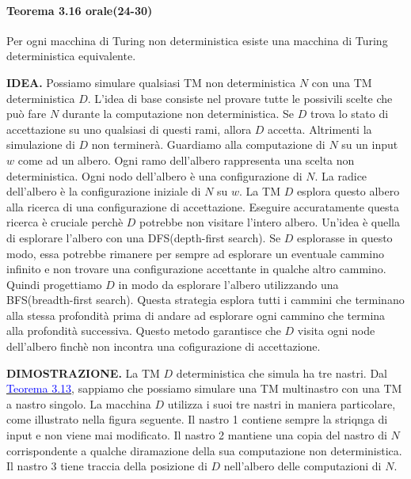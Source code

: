 \documentclass{article}
\begin{document}
\paragraph{Teorema 3.16 orale(24-30)}
\label{teorema-3.16}
\text{ }

\begin{tcolorbox}[colback=blue!10!white, colframe=blue!50!black, title=Teorema 3.16 orale(24-30)]
    Per ogni macchina di Turing non deterministica esiste una macchina di Turing deterministica equivalente.
\end{tcolorbox}

\textbf{IDEA.}
Possiamo simulare qualsiasi TM non deterministica $N$ con una TM deterministica $D$.
L'idea di base consiste nel provare tutte le possivili scelte che può fare $N$ durante la computazione non deterministica.
Se $D$ trova lo stato di accettazione su uno qualsiasi di questi rami, allora $D$ accetta.
Altrimenti la simulazione di $D$ non terminerà.
Guardiamo alla computazione di $N$ su un input $w$ come ad un albero.
Ogni ramo dell'albero rappresenta una scelta non deterministica.
Ogni nodo dell'albero è una configurazione di $N$.
La radice dell'albero è la configurazione iniziale di $N$ su $w$.
La TM $D$ esplora questo albero alla ricerca di una configurazione di accettazione.
Eseguire accuratamente questa ricerca è cruciale perchè $D$ potrebbe non visitare l'intero albero.
Un'idea è quella di esplorare l'albero con una DFS(depth-first search).
Se $D$ esplorasse in questo modo, essa potrebbe rimanere per sempre ad esplorare un eventuale cammino infinito e non trovare una configurazione accettante in qualche altro cammino.
Quindi progettiamo $D$ in modo da esplorare l'albero utilizzando una BFS(breadth-first search).
Questa strategia esplora tutti i cammini che terminano alla stessa profondità prima di andare ad esplorare ogni cammino che termina alla profondità successiva.
Questo metodo garantisce che $D$ visita ogni node dell'albero finchè non incontra una cofigurazione di accettazione.
\vspace{1em}

\textbf{DIMOSTRAZIONE.}
La TM $D$ deterministica che simula ha tre nastri.
Dal \hyperref[th:da MdT multitape a single tape]{\textcolor{blue}{Teorema 3.13}}, sappiamo che possiamo simulare una TM multinastro con una TM a nastro singolo.
La macchina $D$ utilizza i suoi tre nastri in maniera particolare, come illustrato nella figura seguente.
Il nastro 1 contiene sempre la striqnga di input e non viene mai modificato.
Il nastro 2 mantiene una copia del nastro di $N$ corrispondente a qualche diramazione della sua computazione non deterministica.
Il nastro 3 tiene traccia della posizione di $D$ nell'albero delle computazioni di $N$.
\end{document}
